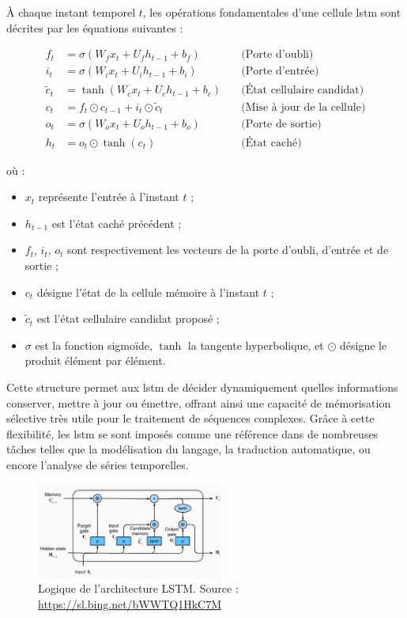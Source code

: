 \documentclass[12pt]{report}
\begin{document}
À chaque instant temporel \( t \), les opérations fondamentales d'une cellule \gls{lstm} sont décrites par les équations suivantes :

\begin{align*}
f_t &= \sigma(W_f x_t + U_f h_{t-1} + b_f) \quad &\text{(Porte d'oubli)} \\
i_t &= \sigma(W_i x_t + U_i h_{t-1} + b_i) \quad &\text{(Porte d'entrée)} \\
\tilde{c}_t &= \tanh(W_c x_t + U_c h_{t-1} + b_c) \quad &\text{(État cellulaire candidat)} \\
c_t &= f_t \odot c_{t-1} + i_t \odot \tilde{c}_t \quad &\text{(Mise à jour de la cellule)} \\
o_t &= \sigma(W_o x_t + U_o h_{t-1} + b_o) \quad &\text{(Porte de sortie)} \\
h_t &= o_t \odot \tanh(c_t) \quad &\text{(État caché)}
\end{align*}

où :
\begin{itemize}
    \item \( x_t \) représente l’entrée à l’instant \( t \) ;
    \item \( h_{t-1} \) est l’état caché précédent ;
    \item \( f_t \), \( i_t \), \( o_t \) sont respectivement les vecteurs de la porte d’oubli, d’entrée et de sortie ;
    \item \( c_t \) désigne l’état de la cellule mémoire à l’instant \( t \) ;
    \item \( \tilde{c}_t \) est l’état cellulaire candidat proposé ;
    \item \( \sigma \) est la fonction sigmoïde, \( \tanh \) la tangente hyperbolique, et \( \odot \) désigne le produit élément par élément.
\end{itemize}

Cette structure permet aux \gls{lstm} de décider dynamiquement quelles informations conserver, mettre à jour ou émettre, offrant ainsi une capacité de mémorisation sélective très utile pour le traitement de séquences complexes. Grâce à cette flexibilité, les \gls{lstm} se sont imposés comme une référence dans de nombreuses tâches telles que la modélisation du langage, la traduction automatique, ou encore l’analyse de séries temporelles.

\begin{figure}[H]
    \centering
    \includegraphics[width=0.55\textwidth]{lstm_image.png}
    \caption{Logique de l'architecture LSTM. Source : \url{https://sl.bing.net/bWWTQ1HkC7M}}
    \label{fig:lstm_architecture}
\end{figure}
\end{document}
